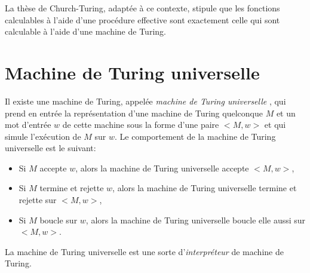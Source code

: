 La thèse de Church-Turing, adaptée à ce contexte, stipule que les fonctions calculables à l'aide d'une procédure effective sont exactement celle qui sont calculable à l'aide d'une machine de Turing.

\section{Machine de Turing universelle}

Il existe une machine de Turing, appelée \og \textit{machine de Turing universelle} \fg{}, qui prend en entrée la représentation d'une machine de Turing quelconque $M$ et un mot d'entrée $w$ de cette machine sous la forme d'une paire $<M, w>$ et qui simule l'exécution de $M$ sur $w$.
Le comportement de la machine de Turing universelle est le suivant:
\begin{itemize}
\item
Si $M$ accepte $w$, alors la machine de Turing universelle accepte $<M, w>$,
\item
Si $M$ termine et rejette $w$, alors la machine de Turing universelle termine et rejette sur $<M, w>$,
\item
Si $M$ boucle sur $w$, alors la machine de Turing universelle boucle elle aussi sur $<M, w>$.
\end{itemize}
La machine de Turing universelle est une sorte d'\textit{interpréteur} de machine de Turing.


